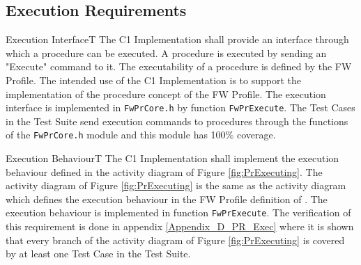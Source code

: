 \documentclass[requirements]{../fwprofile}
\begin{document}
\subsection{Execution Requirements}\label{req:execInterface}

\begin{fw_req_note}{Execution Interface}{T}
{The C1 Implementation shall provide an interface through which a procedure 
can be executed.}
{A procedure is executed by sending an "Execute" command to it.}
{The executability of a procedure is defined by the FW Profile. 
The intended use of the C1 Implementation is to support the implementation of the procedure 
concept of the FW Profile.}
{The execution interface is implemented in \texttt{FwPrCore.h} by 
function \texttt{FwPrExecute}.} 
{The Test Cases in the Test Suite send execution commands to procedures 
through the functions of the \texttt{FwPrCore.h} module and this module has 100\% coverage.}
\end{fw_req_note}


\begin{fw_req}{Execution Behaviour}{T}
{The C1 Implementation shall implement the execution behaviour defined in the 
activity diagram of Figure \ref{fig:PrExecuting}.}
{The activity diagram of Figure \ref{fig:PrExecuting} is the same as the activity diagram which defines the execution behaviour in the FW Profile definition of \cite{ref:fwprofile}.}
{The execution behaviour is implemented in function \texttt{FwPrExecute}.} 
{The verification of this requirement is done in appendix 
\ref{Appendix_D_PR_Exec} where it is shown that every branch of the activity diagram of Figure 
\ref{fig:PrExecuting} is covered by at least one Test Case in the Test Suite.}
\end{fw_req}
\end{document}
